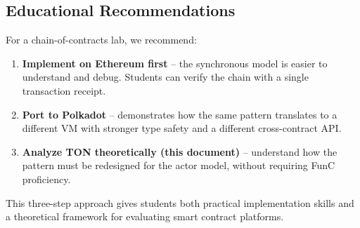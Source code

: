 \subsection{Educational Recommendations}

For a chain-of-contracts lab, we recommend:

\begin{enumerate}
    \item \textbf{Implement on Ethereum first} -- the synchronous model is
          easier to understand and debug. Students can verify the chain with
          a single transaction receipt.
    \item \textbf{Port to Polkadot} -- demonstrates how the same pattern
          translates to a different VM with stronger type safety and a
          different cross-contract API.
    \item \textbf{Analyze TON theoretically (this document)} -- understand
          how the pattern must be redesigned for the actor model, without
          requiring FunC proficiency.
\end{enumerate}

This three-step approach gives students both practical implementation skills
and a theoretical framework for evaluating smart contract platforms.